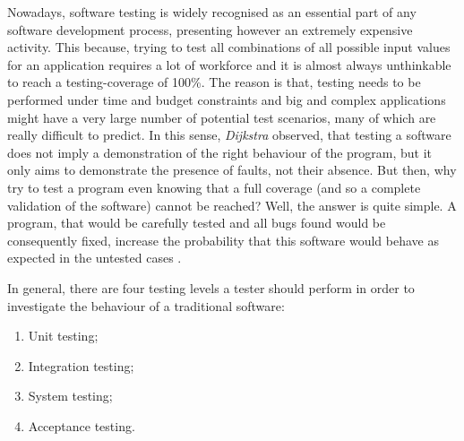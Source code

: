 Nowadays, software testing is widely recognised as an essential part of any software development process, presenting however an extremely expensive activity. This because, trying to test all combinations of all possible input values for an application \cite{glinz} requires a lot of workforce and it is almost always unthinkable to reach a testing-coverage of 100\%. 
The reason is that, testing needs to be performed under time and budget constraints \cite{grano} and big and complex applications might have a very large number of potential test scenarios, many of which are really difficult to predict.  In this sense, \textit{Dijkstra} \cite{dijkstra} observed, that testing a software does not imply a demonstration of the right behaviour of the program, but it only aims to demonstrate the presence of faults, not their absence. But then, why try to test a program even knowing that a full coverage (and so a complete validation of the software) cannot be reached? Well, the answer is quite simple. 
A program, that would be carefully tested and all bugs found would be consequently fixed, increase the probability that this software would behave as expected in the untested cases \cite{glinz}. 

In general, there are four testing levels a tester should perform in order to investigate the behaviour of a traditional software: 
\begin{enumerate}
\item Unit testing; 
\item Integration testing; 
\item System testing; 
\item Acceptance testing.
\end{enumerate}

